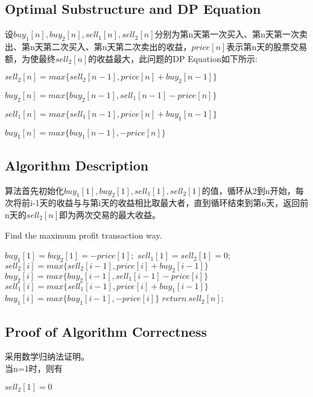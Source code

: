 \documentclass{article}
\begin{document}
\begin{CJK*}{UTF8}{gbsn}
\subsection{Optimal Substructure and DP Equation}

设$buy_1[n],buy_2[n],sell_1[n],sell_2[n]$分别为第n天第一次买入、第n天第一次卖出、第n天第二次买入、第n天第二次卖出的收益，$price[n]$表示第n天的股票交易额，为使最终$sell_2[n]$的收益最大，此问题的DP Equation如下所示:

\begin{center} 
$sell_2[n]=max\{sell_2[n-1], price[n]+buy_2[n-1]\}$

$buy_2[n]=max\{buy_2[n-1], sell_1[n-1]-price[n]\}$

$sell_1[n]=max\{sell_1[n-1], price[n]+buy_1[n-1]\}$

$buy_1[n]=max\{buy_1[n-1], -price[n]\}$
\end{center} 

\subsection{Algorithm Description}
算法首先初始化$buy_1[1],buy_2[1],sell_1[1],sell_2[1]$的值，循环从2到n开始，每次将前i-1天的收益与与第i天的收益相比取最大者，直到循环结束到第n天，返回前n天的$sell_2[n]$即为两次交易的最大收益。

\begin{algorithm}[htbp]   
  \caption{Find the maximum profit transaction way.}  
  \begin{algorithmic}[1] 
	\State $buy_1[1]=buy_2[1]=-price[1];$
	\State $ sell_1[1]=sell_2[1]=0$;
	\State $sell_2[i]=max\{sell_2[i-1], price[i]+buy_2[i-1]\}$
	\State $buy_2[i]=max\{buy_2[i-1], sell_1[i-1]-price[i]\}$
	\State $sell_1[i]=max\{sell_1[i-1], price[i]+buy_1[i-1]\}$
	\State $buy_1[i]=max\{buy_1[i-1], -price[i]\}$
     \EndFor
	\State $return\ sell_2[n]$;
    \EndFunction  
  \end{algorithmic}  
\end{algorithm} 


\subsection{Proof of Algorithm Correctness}
采用数学归纳法证明。
\\

当n=1时，则有

\begin{center} 
$sell_2[1]=0$
\end{center} 


\end{CJK*}
\end{document}
